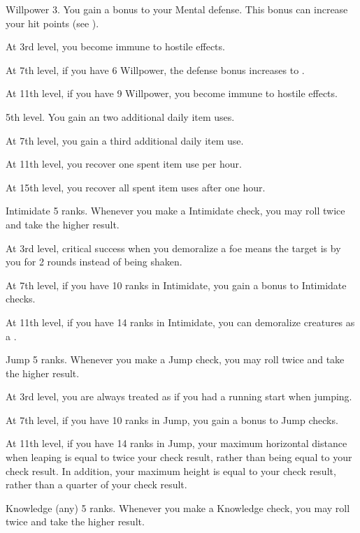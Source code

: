     \featpre Willpower 3.
    \featben You gain a  bonus to your Mental defense.
    This bonus can increase your hit points (see ).

    At 3rd level, you become immune to hostile  effects.

    At 7th level, if you have 6 Willpower, the defense bonus increases to .

    At 11th level, if you have 9 Willpower, you become immune to hostile  effects.

    \featpre 5th level.
    \featben You gain an two additional daily item uses.

    At 7th level, you gain a third additional daily item use.

    At 11th level, you recover one spent item use per hour.

    At 15th level, you recover all spent item uses after one hour.

    \featpre Intimidate 5 ranks.
    \featben Whenever you make a Intimidate check, you may roll twice and take the higher result.

    At 3rd level, critical success when you demoralize a foe means the target is \frightened by you for 2 rounds instead of being shaken.

    At 7th level, if you have 10 ranks in Intimidate, you gain a  bonus to Intimidate checks.

    At 11th level, if you have 14 ranks in Intimidate, you can demoralize creatures as a .

    \featpre Jump 5 ranks.
    \featben Whenever you make a Jump check, you may roll twice and take the higher result.

    At 3rd level, you are always treated as if you had a running start when jumping.

    At 7th level, if you have 10 ranks in Jump, you gain a  bonus to Jump checks.

    At 11th level, if you have 14 ranks in Jump, your maximum horizontal distance when leaping is equal to twice your check result, rather than being equal to your check result.
    In addition, your maximum height is equal to your check result, rather than a quarter of your check result.

    \featpre Knowledge (any) 5 ranks.
    \featben Whenever you make a Knowledge check, you may roll twice and take the higher result.

